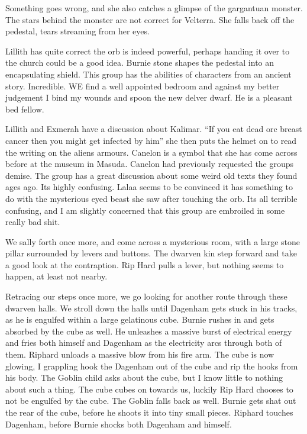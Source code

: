 Something goes wrong, and she also catches a glimpse of the gargantuan monster. The stars behind the monster are not correct for Velterra. She falls back off the pedestal, tears streaming from her eyes.\medskip

Lillith has quite correct the orb is indeed powerful, perhaps handing it over to the church could be a good idea. Burnie stone shapes the pedestal into an encapsulating shield. This group has the abilities of characters from an ancient story. Incredible. WE find a well appointed bedroom and against my better judgement I bind my wounds and spoon the new delver dwarf. He is a pleasant bed fellow.\medskip

Lillith and Exmerah have a discussion about Kalimar. “If you eat dead orc breast cancer then you might get infected by him” she then puts the helmet on to read the writing on the aliens armours. Canelon is a symbol that she has come across before at the museum in Masuda. Canelon had previously requested the groups demise. The group has a great discussion about some weird old texts they found ages ago. Its highly confusing. Lalaa seems to be convinced it has something to do with the mysterious eyed beast she saw after touching the orb. Its all terrible confusing, and I am slightly concerned that this group are embroiled in some really bad shit.\medskip

We sally forth once more, and come across a mysterious room, with a large stone pillar surrounded by levers and buttons. The dwarven kin step forward and take a good look at the contraption. Rip Hard pulls a lever, but nothing seems to happen, at least not nearby.\medskip

Retracing our steps once more, we go looking for another route through these dwarven halls. We stroll down the halls until Dagenham gets stuck in his tracks, as he is engulfed within a large gelatinous cube. Burnie rushes in and gets absorbed by the cube as well. He unleashes a massive burst of electrical energy and fries both himself and Dagenham as the electricity arcs through both of them. Riphard unloads a massive blow from his fire arm. The cube is now glowing, I grappling hook the Dagenham out of the cube and rip the hooks from his body. The Goblin child asks about the cube, but I know little to nothing about such a thing. The cube cubes on towards us, luckily Rip Hard chooses to not be engulfed by the cube. The Goblin falls back as well. Burnie gets shat out the rear of the cube, before he shoots it into tiny small pieces. Riphard touches Dagenham, before Burnie shocks both Dagenham and himself.\medskip

